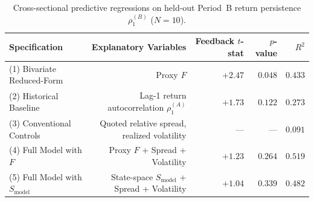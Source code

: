 \begin{table}[htbp]
\centering\small
\caption{Cross-sectional predictive regressions on held-out Period~B return persistence $\rho_{1}^{(B)}$ ($N=10$).}
\label{tab:T6_predictive_models}
\begin{tabular}{lrrrr}
\toprule
Specification & Explanatory Variables & Feedback $t$-stat & $p$-value & $R^2$ \\
\midrule
(1) Bivariate Reduced-Form & Proxy $F$ & $+2.47$ & $0.048$ & $0.433$ \\
(2) Historical Baseline & Lag-1 return autocorrelation $\rho_{1}^{(A)}$ & $+1.73$ & $0.122$ & $0.273$ \\
(3) Conventional Controls & Quoted relative spread, realized volatility & --- & --- & $0.091$ \\
(4) Full Model with $F$ & Proxy $F$ + Spread + Volatility & $+1.23$ & $0.264$ & $0.519$ \\
(5) Full Model with $S_{\mathrm{model}}$ & State-space $S_{\mathrm{model}}$ + Spread + Volatility & $+1.04$ & $0.339$ & $0.482$ \\
\bottomrule
\end{tabular}
\end{table}
